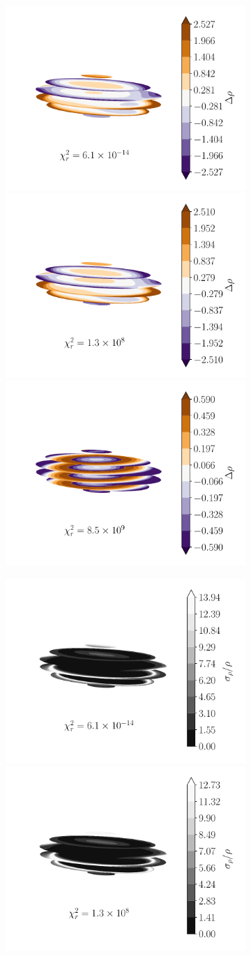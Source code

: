 \documentclass[fleqn,usenatbib]{mnras}
\begin{document}
{\begin{landscape}
\begin{figure}
\begin{subfigure}{0.49\linewidth}
        \includegraphics[width=0.33\linewidth]{figs/in-diff-likelihood.pdf}\hfill
        \includegraphics[width=0.33\linewidth]{figs/in-diff-harmonic.pdf}\hfill
        \includegraphics[width=0.33\linewidth]{figs/in-diff-lumpy.pdf}

        \includegraphics[width=0.33\linewidth]{figs/in-unc-likelihood.pdf}\hfill
        \includegraphics[width=0.33\linewidth]{figs/in-unc-harmonic.pdf}\hfill
        \hspace{0.33\linewidth}


\end{subfigure}
\end{figure}
\end{landscape}}
\end{document}
